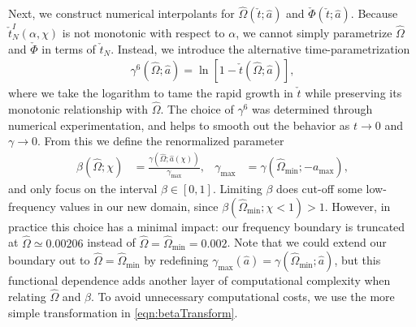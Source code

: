 \documentclass[%
 reprint,
 nofootinbib,
 amsmath,amssymb,
 aps,
 prd,
]{revtex4-2}
\begin{document}
Next, we construct numerical interpolants for $\hat{\Omega}(\check{t}; \hat{a})$ and $\check{\Phi}(\check{t}; \hat{a})$. Because $\check{t}_N^I(\alpha, \chi)$ is not monotonic with respect to $\alpha$, we cannot simply parametrize $\hat{\Omega}$ and $\check{\Phi}$ in terms of $\check{t}_N$. Instead, we introduce the alternative time-parametrization
\begin{align} \label{eqn:gammaTransform}
    \gamma^6(\hat{\Omega};\hat{a}) = \ln\left[1 - {\check{t}}(\hat{\Omega};\hat{a})\right],
\end{align}
where we take the logarithm to tame the rapid growth in $\check{t}$ while preserving its monotonic relationship with $\hat{\Omega}$. The choice of $\gamma^6$ was determined through numerical experimentation, and helps to smooth out the behavior as $t\rightarrow 0$ and $\gamma \rightarrow 0$. From this we define the renormalized parameter
\begin{align} \label{eqn:betaTransform}
    \beta(\hat{\Omega}; \chi) &= \frac{\gamma(\hat{\Omega}; \hat{a}(\chi))}{\gamma_\mathrm{max}},
    &
    \gamma_\mathrm{max} &= \gamma(\hat{\Omega}_\mathrm{min};-a_\mathrm{max}),
\end{align}
and only focus on the interval $\beta \in [0, 1]$. Limiting $\beta$ does cut-off some low-frequency values in our new domain, since $\beta(\hat{\Omega}_\mathrm{min}; \chi < 1) > 1$. However, in practice this choice has a minimal impact: our frequency boundary is truncated at $\hat{\Omega} \simeq 0.00206$ instead of $\hat{\Omega} = \hat{\Omega}_\mathrm{min} = 0.002$. Note that we could extend our boundary out to $\hat{\Omega} = \hat{\Omega}_\mathrm{min}$ by redefining $\gamma_\mathrm{max}(\hat{a}) = \gamma(\hat{\Omega}_\mathrm{min}; \hat{a})$, but this functional dependence adds another layer of computational complexity when relating $\hat{\Omega}$ and $\beta$. To avoid unnecessary computational costs, we use the more simple transformation in \eqref{eqn:betaTransform}.
\end{document}
